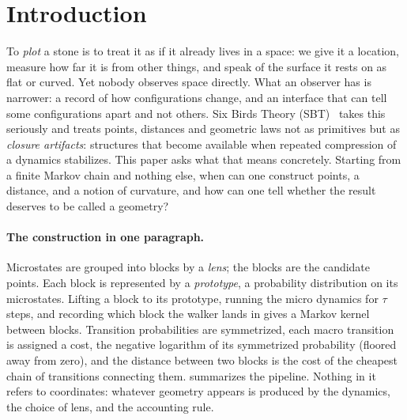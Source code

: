 \documentclass[11pt]{article}
\begin{document}
\section{Introduction}
\label{sec:introduction}

To \emph{plot} a stone is to treat it as if it already lives in a space: we give it a location, measure how far it is from other things, and speak of the surface it rests on as flat or curved.
Yet nobody observes space directly.
What an observer has is narrower: a record of how configurations change, and an interface that can tell some configurations apart and not others.
Six Birds Theory (SBT)~\cite{SixBirdsTheory} takes this seriously and treats points, distances and geometric laws not as primitives but as \emph{closure artifacts}: structures that become available when repeated compression of a dynamics stabilizes.
This paper asks what that means concretely.
Starting from a finite Markov chain and nothing else, when can one construct points, a distance, and a notion of curvature, and how can one tell whether the result deserves to be called a geometry?

\paragraph{The construction in one paragraph.}
Microstates are grouped into blocks by a \emph{lens}; the blocks are the candidate points.
Each block is represented by a \emph{prototype}, a probability distribution on its microstates.
Lifting a block to its prototype, running the micro dynamics for $\tau$ steps, and recording which block the walker lands in gives a Markov kernel between blocks.
Transition probabilities are symmetrized, each macro transition is assigned a cost, the negative logarithm of its symmetrized probability (floored away from zero), and the distance between two blocks is the cost of the cheapest chain of transitions connecting them.
 summarizes the pipeline.
Nothing in it refers to coordinates: whatever geometry appears is produced by the dynamics, the choice of lens, and the accounting rule.
\end{document}
